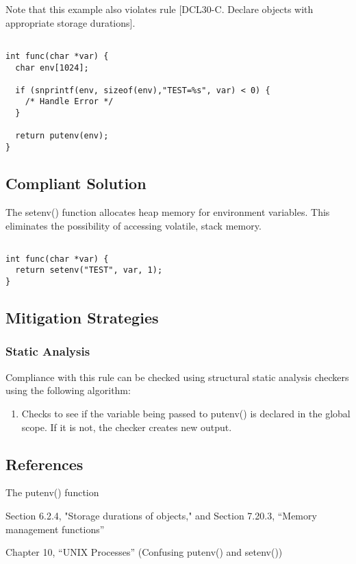 Note that this example also violates rule [DCL30-C. Declare objects with
appropriate storage durations].

\begin{verbatim}

int func(char *var) {
  char env[1024];

  if (snprintf(env, sizeof(env),"TEST=%s", var) < 0) {
    /* Handle Error */
  }

  return putenv(env);
}

\end{verbatim}

\subsection{Compliant Solution}

The setenv() function allocates heap memory for environment variables. This
eliminates the possibility of accessing volatile, stack memory.

\begin{verbatim}

int func(char *var) {
  return setenv("TEST", var, 1);
}

\end{verbatim}

\subsection{Mitigation Strategies}
\subsubsection{Static Analysis} 

Compliance with this rule can be checked using structural static analysis checkers using the following algorithm:

\begin{enumerate}
\item{Checks to see if the variable being passed to putenv() is declared in the global
scope.  If it is not, the checker creates new output.}
\end{enumerate}

\subsection{References}


 The putenv() function

Section 6.2.4, "Storage durations of objects," and Section 7.20.3, ``Memory management functions''

 Chapter 10, ``UNIX Processes'' (Confusing putenv() and setenv())
